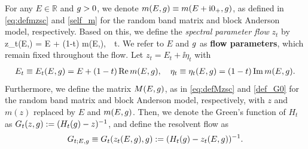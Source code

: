 \begin{definition}\label{def_flow}
For any $E \in \mathbb R$ and $g>0$, we denote $m(E,g)\equiv m(E+\mathrm{i} 0_+,g)$, as defined in \eqref{eq:defmzsc} and \eqref{self_m} for the random band matrix and block Anderson model, respectively. Based on this, we define the \emph{spectral parameter flow} $z_t$ by 
\be\label{eq:zt}
z_t(E,\ilambda) = E + (1-t) m(E,\ilambda),\quad {}\ \ t\in [0, 1]. 
\ee
We refer to $E$ and $g$ as {\bf flow parameters}, which remain fixed throughout the flow. Let $z_t=E_t + \ii \eta_t$ with 
	\begin{align}\label{eta}
		E_t\equiv E_t(E,g)=E+(1-t)\operatorname{{\mathrm{Re}}} m(E,g),\quad \eta_t\equiv \eta_t(E,g) = (1-t)  \operatorname{{\mathrm{Im}}} m(E,g).
	\end{align}
Furthermore, we define the matrix $M(E,g)$, as in \eqref{eq:defMzsc} and \eqref{def_G0} for the random band matrix and block Anderson model, respectively, with $z$ and $m(z)$ replaced by $E$ and $m(E,g)$.  
Then, we denote the Green's function of $H_{t}$ as $G_t(z,g):=(H_t(g)-z)^{-1}$, and define the resolvent flow as 
	\begin{align}\label{self_Gt}
		G_{t;E,g}\equiv G_t(z_t(E,g),g):=(H_{t}(g)-z_t{(E,g)})^{-1}.
	\end{align}
\end{definition}

